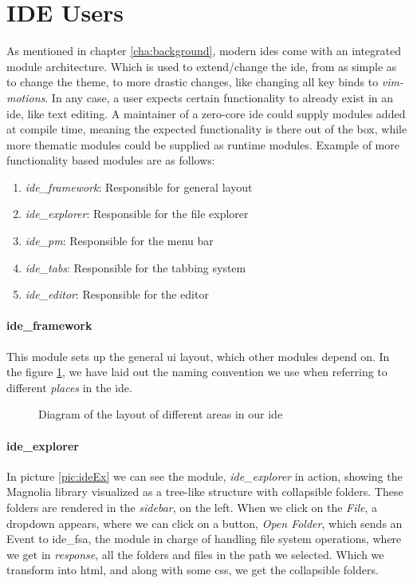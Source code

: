 \section{IDE Users}

As mentioned in chapter \ref{cha:background}, modern \gls*{ide}s come with an
integrated module architecture. Which is used to extend/change the \gls*{ide},
from as simple as to change the theme, to more drastic changes, like changing
all key binds to \textit{vim-motions}. In any case, a user expects certain
functionality to already exist in an \gls*{ide}, like text editing. A maintainer
of a zero-core \gls*{ide} could supply modules added at compile time, meaning the
expected functionality is there out of the box, while more thematic modules
could be supplied as runtime modules. Example of more functionality based
modules are as follows:

\begin{enumerate}
  \item \textit{ide\_framework}: Responsible for general layout
  \item \textit{ide\_explorer}: Responsible for the file explorer
  \item \textit{ide\_pm}: Responsible for the menu bar
  \item \textit{ide\_tabs}: Responsible for the tabbing system
  \item \textit{ide\_editor}: Responsible for the editor
\end{enumerate}

\paragraph{ide\_framework} This module sets up the general \gls*{ui} layout,
which other modules depend on. In the figure \ref{fig:ideLayout}, we have laid
out the naming convention we use when referring to different \textit{places} in
the \gls*{ide}.

\begin{figure}[H]
  \centering
  
  \caption{
    Diagram of the layout of different areas in our \gls*{ide}
  }
  \label{fig:ideLayout}
\end{figure}

\paragraph{ide\_explorer} In picture \ref{pic:ideEx} we can see the
module, \textit{ide\_explorer} in action, showing the Magnolia library
visualized as a tree-like structure with collapsible folders. These folders are
rendered in the \textit{sidebar}, on the left. When we click on the
\textit{File}, a dropdown appears, where we can click on a button,
\textit{Open Folder}, which sends an Event to \gls*{ide}\_fsa, the module in
charge of handling file system operations, where we get in \textit{response},
all the folders and files in the path we selected. Which we transform into
\gls*{html}, and along with some \gls*{css}, we get the collapsible folders.

